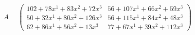 \documentclass[preview]{standalone}
\begin{document}
\begin{align*}
A = \begin{pmatrix}102 + 78x^{1} + 83x^{2} + 72x^{3} & 56 + 107x^{1} + 66x^{2} + 59x^{3} \\ 50 + 32x^{1} + 80x^{2} + 126x^{3} & 56 + 115x^{1} + 84x^{2} + 48x^{3} \\ 62 + 86x^{1} + 56x^{2} + 13x^{3} & 77 + 67x^{1} + 39x^{2} + 112x^{3}\end{pmatrix}
\end{align*}
\end{document}
